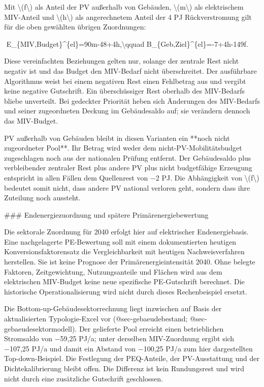 \documentclass[
  ngerman,
  a4paper,
  DIV=11]{scrreprt}
\newenvironment{Shaded}{\begin{snugshade}}{\end{snugshade}}
\newcommand{\NormalTok}[1]{\textcolor[rgb]{0.00,0.23,0.31}{#1}}
\begin{document}
\begin{enumerate}
\begin{Shaded}
\begin{Highlighting}[]
\NormalTok{Mit \textbackslash{}(f\textbackslash{}) als Anteil der PV außerhalb von Gebäuden, \textbackslash{}(m\textbackslash{}) als elektrischem MIV{-}Anteil und \textbackslash{}(h\textbackslash{}) als angerechnetem Anteil der 4 PJ Rückverstromung gilt für die oben gewählten übrigen Zuordnungen:}

\NormalTok{$$}
\NormalTok{E\_\{MIV,Budget\}\^{}\{el\}=90m{-}48+4h,\textbackslash{}qquad B\_\{Geb,Ziel\}\^{}\{el\}={-}7+4h{-}149f.}
\NormalTok{$$}

\NormalTok{Diese vereinfachten Beziehungen gelten nur, solange der zentrale Rest nicht negativ ist und das Budget den MIV{-}Bedarf nicht überschreitet. Der ausführbare Algorithmus weist bei einem negativen Rest einen Fehlbetrag aus und vergibt keine negative Gutschrift. Ein überschüssiger Rest oberhalb des MIV{-}Bedarfs bliebe unverteilt. Bei gedeckter Priorität heben sich Änderungen des MIV{-}Bedarfs und seiner zugeordneten Deckung im Gebäudesaldo auf; sie verändern dennoch das MIV{-}Budget.}

\NormalTok{PV außerhalb von Gebäuden bleibt in diesen Varianten ein **noch nicht zugeordneter Pool**. Ihr Betrag wird weder dem nicht{-}PV{-}Mobilitätsbudget zugeschlagen noch aus der nationalen Prüfung entfernt. Der Gebäudesaldo plus verbleibender zentraler Rest plus andere PV plus nicht budgetfähige Erzeugung entspricht in allen Fällen dem Quellenrest von −2 PJ. Die Abhängigkeit von \textbackslash{}(f\textbackslash{}) bedeutet somit nicht, dass andere PV national verloren geht, sondern dass ihre Zuteilung noch aussteht.}

\NormalTok{\#\#\# Endenergiezuordnung und spätere Primärenergiebewertung}

\NormalTok{Die sektorale Zuordnung für 2040 erfolgt hier auf elektrischer Endenergiebasis. Eine nachgelagerte PE{-}Bewertung soll mit einem dokumentierten heutigen Konversionsfaktorensatz die Vergleichbarkeit mit heutigen Nachweisverfahren herstellen. Sie ist keine Prognose der Primärenergieintensität 2040. Ohne belegte Faktoren, Zeitgewichtung, Nutzungsanteile und Flächen wird aus dem elektrischen MIV{-}Budget keine neue spezifische PE{-}Gutschrift berechnet. Die historische Operationalisierung wird nicht durch dieses Rechenbeispiel ersetzt.}

\NormalTok{Die Bottom{-}up{-}Gebäudesektorrechnung liegt inzwischen auf Basis der aktualisierten Typologie{-}Excel vor (@sec{-}gebaeudebestand; @sec{-}gebaeudesektormodell). Der gelieferte Pool erreicht einen betrieblichen Stromsaldo von −59,25 PJ/a; unter derselben MIV{-}Zuordnung ergibt sich −107,25 PJ/a und damit ein Abstand von −100,25 PJ/a zum hier dargestellten Top{-}down{-}Beispiel. Die Festlegung der PEQ{-}Anteile, der PV{-}Ausstattung und der Dichtekalibrierung bleibt offen. Die Differenz ist kein Rundungsrest und wird nicht durch eine zusätzliche Gutschrift geschlossen.}


\end{Highlighting}
\end{Shaded}
\end{enumerate}
\end{document}
